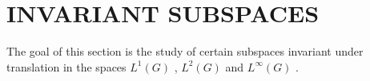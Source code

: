 \section{INVARIANT SUBSPACES}

The goal of this section is the study of certain subspaces invariant under translation in the spaces \(L^{1}(G)\) , \(L^{2}(G)\) and \(L^{\infty}(G)\) .

